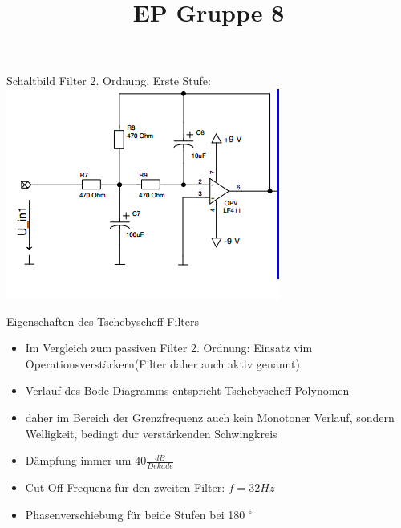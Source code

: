 \documentclass[compress,11pt]{beamer}
\title{EP Gruppe 8}
\begin{document}
\begin{frame}

Schaltbild Filter 2. Ordnung, Erste Stufe:\\
\includegraphics[width=.7\textwidth]{schalt/schalt_41}

\end{frame}

\begin{frame}
\begin{block}{Eigenschaften des Tschebyscheff-Filters}
\begin{itemize}
\item Im Vergleich zum passiven Filter 2. Ordnung: Einsatz vim Operationsverstärkern(Filter daher auch aktiv genannt)
\item Verlauf des Bode-Diagramms entspricht Tschebyscheff-Polynomen
\item daher im Bereich der Grenzfrequenz auch kein Monotoner Verlauf, sondern Welligkeit, bedingt dur verstärkenden Schwingkreis
\item Dämpfung immer um $40 \frac{dB}{Dekade}$
\item Cut-Off-Frequenz für den zweiten Filter: $f = 32 Hz$
\item Phasenverschiebung für beide Stufen bei 180 $^\circ$
\end{itemize}
\end{block}



\end{frame}
\end{document}
